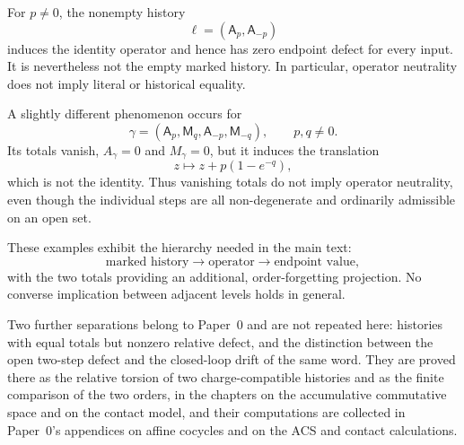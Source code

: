 For \(p\ne0\), the nonempty history
\[
    \ell=(\mathsf A_p,\mathsf A_{-p})
\]
induces the identity operator and hence has zero endpoint defect for every
input.  It is nevertheless not the empty marked history.  In particular,
operator neutrality does not imply literal or historical equality.

A slightly different phenomenon occurs for
\[
    \gamma=(\mathsf A_p,\mathsf M_q,\mathsf A_{-p},\mathsf M_{-q}),
    \qquad p,q\ne0 .
\]
Its totals vanish, \(A_\gamma=0\) and \(M_\gamma=0\), but it induces the
translation
\[
    z\longmapsto z+p(1-e^{-q}),
\]
which is not the identity.  Thus vanishing totals do not imply operator
neutrality, even though the individual steps are all non-degenerate and
ordinarily admissible on an open set.

These examples exhibit the hierarchy needed in the main text:
\[
    \text{marked history}
      \longrightarrow \text{operator}
      \longrightarrow \text{endpoint value},
\]
with the two totals providing an additional, order-forgetting projection.  No
converse implication between adjacent levels holds in general.

Two further separations belong to Paper~0 and are not repeated here: histories
with equal totals but nonzero relative defect, and the distinction between the
open two-step defect and the closed-loop drift of the same word.  They are
proved there as the relative torsion of two charge-compatible histories and as
the finite comparison of the two orders, in the chapters on the accumulative
commutative space and on the contact model, and their computations are
collected in Paper~0's appendices on affine cocycles and on the ACS and contact
calculations.
